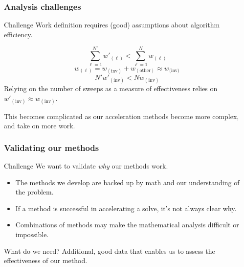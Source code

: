 \documentclass[xcolor=x11names, compress, handout]{beamer}
\begin{document}
\begin{frame}
  \frametitle{Analysis challenges}
  \pause
  \begin{block}{Challenge}
    Work definition requires (good) assumptions about algorithm efficiency.
  \end{block}
  \pause
    \begin{equation*}
    \sum_{\ell = 1}^{N'}w'_{(\ell)} <  \sum_{\ell = 1}^Nw_{(\ell)}
  \end{equation*}
  \pause
  \begin{equation*}
    w_{(\ell)} = w_{(\text{inv})} + w_{(\text{other})} \approx w_{\text{(inv)}}
  \end{equation*}
  \pause
    \begin{equation*}
    N'w'_{(\text{inv})} <  Nw_{{(\text{inv})}}
  \end{equation*}
  \pause
  Relying on the number of sweeps as a measure of effectiveness relies
  on $w'_{(\text{inv})} \approx  w_{{(\text{inv})}}$.
  \pause
  \begin{block}{}
    This becomes complicated as our acceleration methods become more
    complex, and take on more work.
  \end{block}
\end{frame}

\begin{frame}
  \frametitle{Validating our methods}
  \pause
  \begin{block}{Challenge}
    We want to validate \textit{why} our methods work.
  \end{block}
  \pause
  \begin{itemize}[<+->]
  \item The methods we develop are backed up by math and our
    understanding of the problem.
  \item If a method is successful in accelerating a solve, it's not
    always clear why.
  \item Combinations of methods may make the mathematical analysis difficult or impossible.
  \end{itemize}
  \pause
  \begin{block}{What do we need?}
    Additional, good data that enables us to assess the effectiveness
    of our method.
  \end{block}
\end{frame}
\end{document}
